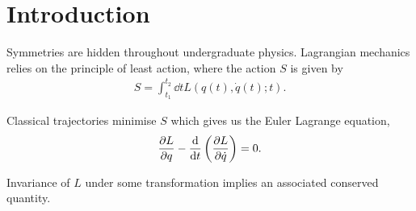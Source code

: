 
\section{Introduction}

Symmetries are hidden throughout undergraduate physics. Lagrangian mechanics relies on the principle of least action, where the action $S$ is given by
\begin{align}
    S = \int_{t_1}^{t_2} \dd{t} L \left( q\left( t \right), \dot{q}\left( t \right) ; t  \right) 
.\end{align}

Classical trajectories minimise $S$ which gives us the Euler Lagrange equation,
\begin{align}
    \pdv{L}{q} - \dv{t} \left( \pdv{L}{\dot{q}} \right) = 0
.\end{align}

\begin{theorem}
    Invariance of $L$ under some transformation implies an associated conserved quantity.
\end{theorem}

